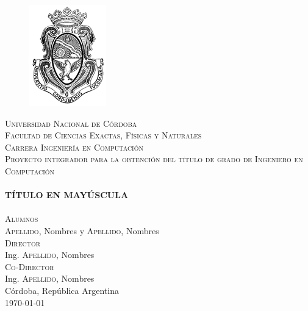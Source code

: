 \begin{titlepage}
    \begin{center}
        
    \begin{figure}[h]
        \begin{center}
            \includegraphics{logo_unc.png}
        \end{center}
    \end{figure}
    \vspace{0.5em}
    
    \textsc{\LARGE Universidad Nacional de Córdoba}\\[0.3cm] %
    \textsc{\Large Facultad de Ciencias Exactas, Físicas y Naturales}\\[0.3cm] %
    \textsc{\Large Carrera Ingeniería en Computación}\\[0.75cm] %
    
    \textsc{\large Proyecto integrador para la obtención del título de grado de Ingeniero en Computación}\\[1.0cm]
    
    \HRule \\[0.4cm]
    \textsc{\textbf{TÍTULO EN MAYÚSCULA}}\\[0.4cm] %
    \HRule \\[1.5cm]
    
    \textsc{\Large Alumnos}\\[0.1cm]
    \large \textsc{Apellido}, Nombres y \textsc{Apellido}, Nombres \\[0.5cm]
    
    \textsc{\large Director}\\[0.1cm]
    Ing. \textsc{Apellido}, Nombres \\[0.5cm]
    
    \textsc{\large Co-Director}\\[0.1cm]
    Ing. \textsc{Apellido}, Nombres \\[2.5cm]
    
    Córdoba, República Argentina \\
    \monthyeardate\today %
    
    
    \end{center}
\end{titlepage}

\clearpage{\thispagestyle{empty}\cleardoublepage}       %